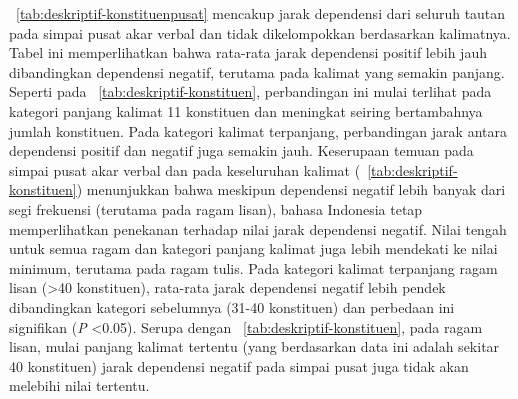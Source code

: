 \tab~\ref{tab:deskriptif-konstituenpusat} mencakup jarak dependensi dari seluruh tautan pada simpai pusat akar verbal dan tidak dikelompokkan berdasarkan kalimatnya. Tabel ini memperlihatkan bahwa rata-rata jarak dependensi positif lebih jauh dibandingkan dependensi negatif, terutama pada kalimat yang semakin panjang. Seperti pada \tab~\ref{tab:deskriptif-konstituen}, perbandingan ini mulai terlihat pada kategori panjang kalimat 11 konstituen dan meningkat seiring bertambahnya jumlah konstituen. Pada kategori kalimat terpanjang, perbandingan jarak antara dependensi positif dan negatif juga semakin jauh. Keserupaan temuan pada simpai pusat akar verbal dan pada keseluruhan kalimat (\tab~\ref{tab:deskriptif-konstituen}) menunjukkan bahwa meskipun dependensi negatif lebih banyak dari segi frekuensi (terutama pada ragam lisan), bahasa Indonesia tetap memperlihatkan penekanan terhadap nilai jarak dependensi negatif. Nilai tengah untuk semua ragam dan kategori panjang kalimat juga lebih mendekati ke nilai minimum, terutama pada ragam tulis. Pada kategori kalimat terpanjang ragam lisan (\textgreater 40 konstituen), rata-rata jarak dependensi negatif lebih pendek dibandingkan kategori sebelumnya (31-40 konstituen) dan perbedaan ini signifikan (\textit{P} \textless 0.05).  Serupa dengan \tab~\ref{tab:deskriptif-konstituen}, pada ragam lisan, mulai panjang kalimat tertentu (yang berdasarkan data ini adalah sekitar 40 konstituen) jarak dependensi negatif pada simpai pusat juga tidak akan melebihi nilai tertentu. 

